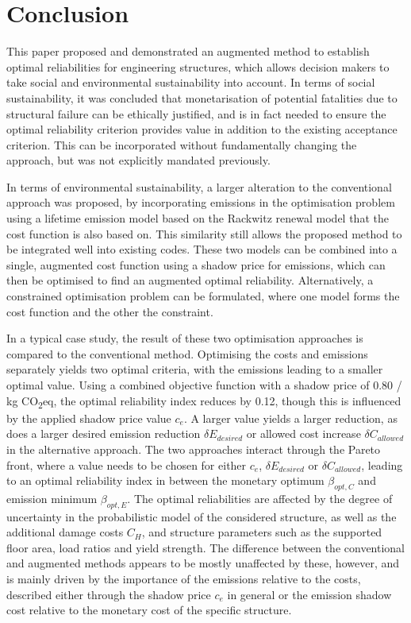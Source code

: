 \newpage
\section{Conclusion}

This paper proposed and demonstrated an augmented method to establish optimal reliabilities for engineering structures, which allows decision makers to take social and environmental sustainability into account.
In terms of social sustainability, it was concluded that monetarisation of potential fatalities due to structural failure can be ethically justified, and is in fact needed to ensure the optimal reliability criterion provides value in addition to the existing acceptance criterion.
This can be incorporated without fundamentally changing the approach, but was not explicitly mandated previously.

In terms of environmental sustainability, a larger alteration to the conventional approach was proposed, by incorporating emissions in the optimisation problem using a lifetime emission model based on the Rackwitz renewal model that the cost function is also based on.
This similarity still allows the proposed method to be integrated well into existing codes.
These two models can be combined into a single, augmented cost function using a shadow price for emissions, which can then be optimised to find an augmented optimal reliability.
Alternatively, a constrained optimisation problem can be formulated, where one model forms the cost function and the other the constraint.

In a typical case study, the result of these two optimisation approaches is compared to the conventional method.
Optimising the costs and emissions separately yields two optimal criteria, with the emissions leading to a smaller optimal value.
Using a combined objective function with a shadow price of 0.80 \EUR{}/ kg CO\textsubscript{2}eq, the optimal reliability index reduces by 0.12, though this is influenced by the applied shadow price value $c_e$.
A larger value yields a larger reduction, as does a larger desired emission reduction $\delta E_{desired}$ or allowed cost increase $\delta C_{allowed}$ in the alternative approach.
The two approaches interact through the Pareto front, where a value needs to be chosen for either $c_e$, $\delta E_{desired}$ or $\delta C_{allowed}$, leading to an optimal reliability index in between the monetary optimum $\beta_{opt,C}$ and emission minimum $\beta_{opt,E}$.
The optimal reliabilities are affected by the degree of uncertainty in the probabilistic model of the considered structure, as well as the additional damage costs $C_H$, and structure parameters such as the supported floor area, load ratios and yield strength.
The difference between the conventional and augmented methods appears to be mostly unaffected by these, however, and is mainly driven by the importance of the emissions relative to the costs, described either through the shadow price $c_e$ in general or the emission shadow cost relative to the monetary cost of the specific structure.

